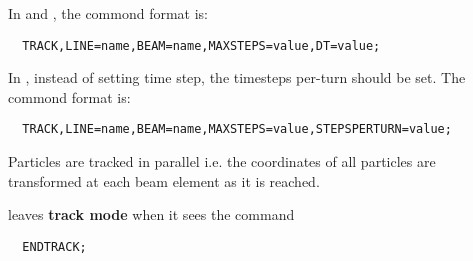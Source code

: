 In \opalt and \opalmap, the commond format is:
\begin{verbatim}
  TRACK,LINE=name,BEAM=name,MAXSTEPS=value,DT=value;
\end{verbatim}

In \opalcycl, instead of setting time step, the timesteps per-turn should be set. 
The commond format is:  
\begin{verbatim}
  TRACK,LINE=name,BEAM=name,MAXSTEPS=value,STEPSPERTURN=value;
\end{verbatim}

Particles are tracked in parallel i.e. the coordinates of all particles
are transformed at each beam element as it is reached.

\opal leaves \textbf{track mode} when it sees the command
\begin{verbatim}
  ENDTRACK;
\end{verbatim}



